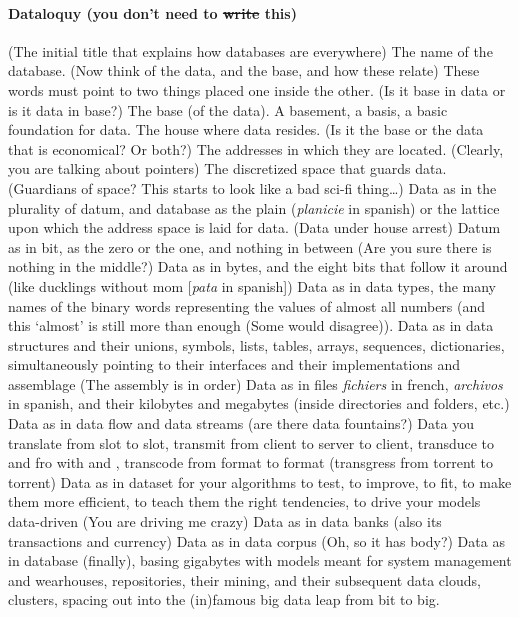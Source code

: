 \paragraph{Dataloquy (you don't need to \sout{write} this)}
(The initial title that explains how databases are everywhere) The name of the database. (Now think of the data, and the base, and how these relate) These words must point to two things placed one inside the other. (Is it base in data or is it data in base?) The base (of the data). A basement, a basis, a basic foundation for data. The house where data resides. (Is it the base or the data that is economical? Or both?) The addresses in which they are located. (Clearly, you are talking about pointers) The discretized space that guards data. (Guardians of space? This starts to look like a bad sci-fi thing\dots) Data as in the plurality of datum, and database as the plain (\textit{planicie} in spanish) or the lattice upon which the address space is laid for data. (Data under house arrest) Datum as in bit, as the zero or the one, and nothing in between (Are you sure there is nothing in the middle?) Data as in bytes, and the eight bits that follow it around (like ducklings without mom [\textit{pata} in spanish]) Data as in data types, the many names of the binary words representing the values of almost all numbers (and this `almost' is still more than enough (Some would disagree)). Data as in data structures and their unions, symbols, lists, tables, arrays, sequences, dictionaries, simultaneously pointing to their interfaces and their implementations and assemblage (The assembly is in order) Data as in files \textit{fichiers} in french, \textit{archivos} in spanish, and their kilobytes and megabytes (inside directories and folders, etc.) Data as in data flow and data streams (are there data fountains?) Data you translate from slot to slot, transmit from client to server to client, transduce to and fro with  and , transcode from format to format (transgress from torrent to torrent) Data as in dataset for your algorithms to test, to improve, to fit, to make them more efficient, to teach them the right tendencies, to drive your models data-driven (You are driving me crazy) Data as in data banks (also its transactions and currency) Data as in data corpus (Oh, so it has body?) Data as in database (finally), basing gigabytes with models meant for system management and wearhouses, repositories, their mining, and their subsequent data clouds, clusters, spacing out into the (in)famous big data leap from bit to big.




